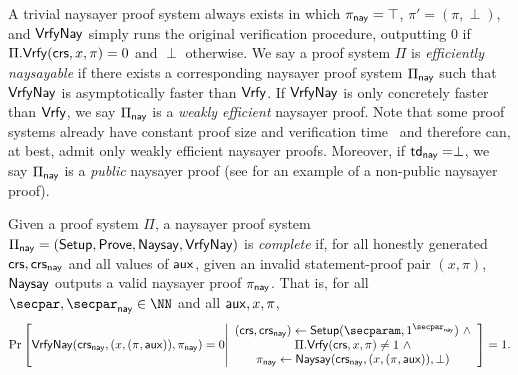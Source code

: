 A trivial naysayer proof system always exists in which $\pi_{\mathsf{nay}} = \top$, $\pi' = (\pi, \perp)$, and ${\mathsf{Vrfy}}\mathsf{Nay}$ simply runs the original verification procedure, outputting $0$ if $\Pi.\mathsf{Vrfy}(\mathsf{crs}, x, \pi) = 0$ and $\perp$ otherwise.
We say a proof system $\Pi$ is \emph{efficiently naysayable} if there exists a corresponding naysayer proof system $\Pi_{\mathsf{nay}}$ such that ${\mathsf{Vrfy}}\mathsf{Nay}$ is asymptotically faster than $\mathsf{Vrfy}$. If ${\mathsf{Vrfy}}\mathsf{Nay}$ is only concretely faster than $\mathsf{Vrfy}$, we say $\Pi_{\mathsf{nay}}$ is a \emph{weakly efficient} naysayer proof. Note that some proof systems already have constant proof size and verification time~\cite{EC:Groth16,C:Schnorr89} and therefore can, at best, admit only weakly efficient naysayer proofs. 
Moreover, if $\mathsf{td}_{\mathsf{nay}} = \perp$, we say $\Pi_{\mathsf{nay}}$ is a \emph{public} naysayer proof (see  for an example of a non-public naysayer proof). 

\begin{definition}
    Given a proof system $\Pi$, a naysayer proof system $\Pi_{\mathsf{nay}} = (\mathsf{Setup}, \mathsf{Prove}, \mathsf{Naysay}, {\mathsf{Vrfy}}\mathsf{Nay})$ is \emph{complete} if, for all honestly generated $\mathsf{crs}, \mathsf{crs}_{\mathsf{nay}}$ and all values of $\mathsf{aux}$,\footnotemark
    given an invalid statement-proof pair $(x,\pi)$, $\mathsf{Naysay}$ outputs a valid naysayer proof $\pi_{\mathsf{nay}}$. That is, for all $\secpar, \naysecpar \in \NN$ and all $\mathsf{aux},x,\pi$,
\begin{equation*}
    \Pr\left[
        \vrfynay(\crs_{\nay}, (x,(\pi, \aux)), \pi_{\nay})=0 
        \middle| 
        \begin{array}{c}
            (\crs, \crs_{\nay}) \gets \setup(\secparam, \naysecparam)~\land\\
            \Pi.\vrfy(\crs, x,\pi) \neq 1~\land\\
            \pi_{\nay} \gets \naysay(\crs_{\nay}, (x, (\pi, \aux)), \perp)
        \end{array}
    \right] = 1.
\end{equation*}
\end{definition}

